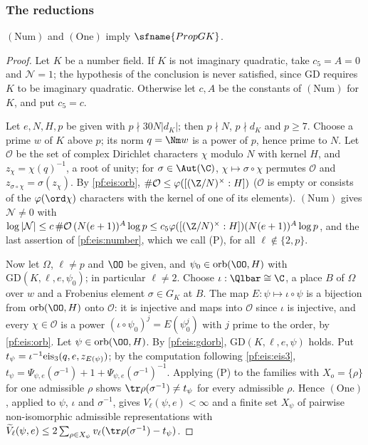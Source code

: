 \subsubsection{The reductions}

\begin{proposition}\label{pf:eis:propGKpf}
$(\mathrm{Num})$ and $(\mathrm{One})$ imply $\sfname{PropGK}$.
\end{proposition}

\begin{proof}
Let $K$ be a number field. If $K$ is not imaginary quadratic, take $c_5=A=0$ and $\mathcal N=1$; the hypothesis of the
conclusion is never satisfied, since $\mathrm{GD}$ requires $K$ to be imaginary quadratic. Otherwise let $c,A$ be the
constants of $(\mathrm{Num})$ for $K$, and put $c_5=c$.

Let $e,N,H,p$ be given with $p\nmid30N|d_K|$; then $p\nmid N$, $p\nmid d_K$ and $p\ge7$. Choose a prime $w$ of $K$ above $p$; its
norm $q=\Nm w$ is a power of $p$, hence prime to $N$. Let $\mathcal O$ be the set of complex Dirichlet characters $\chi$
modulo $N$ with kernel $H$, and $z_\chi=\chi(q)^{-1}$, a root of unity; for $\sigma\in\Aut(\C)$, $\chi\mapsto\sigma\circ\chi$ permutes
$\mathcal O$ and $z_{\sigma\circ\chi}=\sigma(z_\chi)$. By \cref{pf:eis:orb}, $\#\mathcal O\le\varphi([(\Z/N)^\times:H])$ ($\mathcal O$ is empty
or consists of the $\varphi(\ord\chi)$ characters with the kernel of one of its elements). $(\mathrm{Num})$ gives
$\mathcal N\ne0$ with $\log|\mathcal N|\le c\,\#\mathcal O\,(N(e+1))^A\log p\le c_5\varphi([(\Z/N)^\times:H])(N(e+1))^A\log p$, and
the last assertion of \cref{pf:eis:number}, which we call (P), for all $\ell\notin\{2,p\}$.

Now let $\Omega$, $\ell\ne p$ and $\OO$ be given, and $\psi_0\in\mathrm{orb}(\OO,H)$ with $\mathrm{GD}(K,\ell,e,\psi_0)$; in particular
$\ell\ne2$. Choose $\iota:\Qlbar\cong\C$, a place $B$ of $\Omega$ over $w$ and a Frobenius element $\sigma\in G_K$ at $B$. The map
$E:\psi\mapsto\iota\circ\psi$ is a bijection from $\mathrm{orb}(\OO,H)$ onto $\mathcal O$: it is injective and maps into $\mathcal O$ since
$\iota$ is injective, and every $\chi\in\mathcal O$ is a power $(\iota\circ\psi_0)^j=E(\psi_0^j)$ with $j$ prime to the order, by
\cref{pf:eis:orb}. Let $\psi\in\mathrm{orb}(\OO,H)$. By \cref{pf:eis:gdorb}, $\mathrm{GD}(K,\ell,e,\psi)$ holds. Put
$t_\psi=\iota^{-1}\mathrm{eis}_3(q,e,z_{E(\psi)})$; by the computation following \eqref{pf:eis:eis3},
$t_\psi=\Psi_{\psi,e}(\sigma^{-1})+1+\Psi_{\psi,e}(\sigma^{-1})^{-1}$. Applying (P) to the families with $X_o=\{\rho\}$ for one
admissible $\rho$ shows $\tr\rho(\sigma^{-1})\ne t_\psi$ for every admissible $\rho$. Hence $(\mathrm{One})$, applied to $\psi$, $\iota$
and $\sigma^{-1}$, gives $V_\ell(\psi,e)<\infty$ and a finite set $X_\psi$ of pairwise non-isomorphic admissible representations
with $\eisVt_\ell(\psi,e)\le2\sum_{\rho\in X_\psi}\eisv(\tr\rho(\sigma^{-1})-t_\psi)$.


\end{proof}
